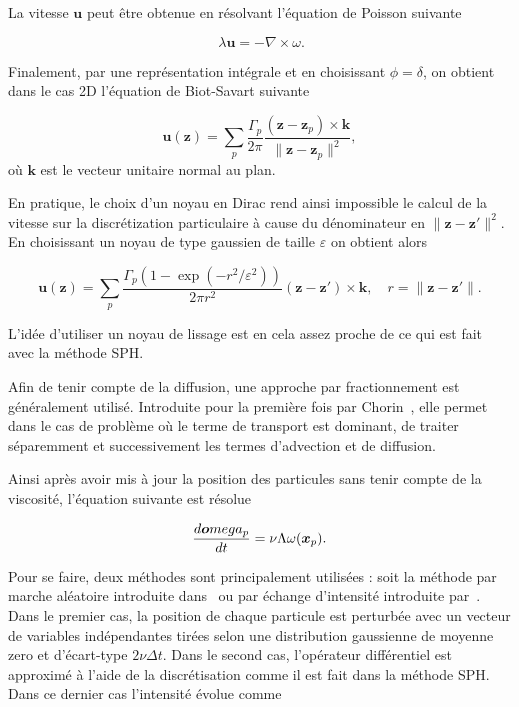 La vitesse $\bm u$ peut être obtenue en résolvant l'équation de Poisson suivante

\begin{equation*}~\label{eq:poisson}
    \lambda \bm u = - \nabla \times \omega.
\end{equation*}

Finalement, par une représentation intégrale et en choisissant $\phi= \delta$, on obtient dans le cas 2D l'équation de Biot-Savart suivante

\begin{equation*}
    \bm u(\bm z) = \sum_p \frac{\Gamma_p}{2\pi} \frac{(\bm z - \bm z_p)\times \bm k}{\|\bm z - \bm z_p\|^2},
\end{equation*}où $\bm k$ est le vecteur unitaire normal au plan.

En pratique, le choix d'un noyau en Dirac rend ainsi impossible le calcul de la vitesse sur la discrétization particulaire à cause du dénominateur en ${\|\bm z - \bm z'\|^2}$. En choisissant un noyau de type gaussien de taille $\varepsilon$ on obtient alors

\begin{equation*}
    \bm u(\bm z) = \sum_p \frac{\Gamma_p(1 - \exp(-r^2 / \varepsilon^2)) }{2\pi r^2} (\bm z - \bm z')\times \bm k, \quad r = \|\bm z - \bm z'\|.
\end{equation*}

L'idée d'utiliser un noyau de lissage est en cela assez proche de ce qui est fait avec la méthode SPH.

Afin de tenir compte de la diffusion, une approche par fractionnement est généralement utilisé. Introduite pour la première fois par Chorin~\cite{chorin_discretization_1973}, elle permet dans le cas de problème où le terme de transport est dominant, de traiter séparemment et successivement les termes d'advection et de diffusion.

Ainsi après avoir mis à jour la position des particules sans tenir compte de la viscosité, l'équation suivante est résolue

\begin{equation*}
    \frac{d\bm omega_p}{dt} = \nu \Lambda \omega(\bm{x}_p).
\end{equation*}

Pour se faire, deux méthodes sont principalement utilisées : soit la méthode par marche aléatoire introduite dans~\cite{chorin_discretization_1973} ou par échange d'intensité introduite par~\cite{1989MaCom..53..485D}.
Dans le premier cas, la position de chaque particule est perturbée avec un vecteur de variables indépendantes tirées selon une distribution gaussienne de moyenne zero et d'écart-type $2\nu \Delta t$. Dans le second cas, l'opérateur différentiel est approximé à l'aide de la discrétisation comme il est fait dans la méthode SPH. Dans ce dernier cas l'intensité évolue comme

